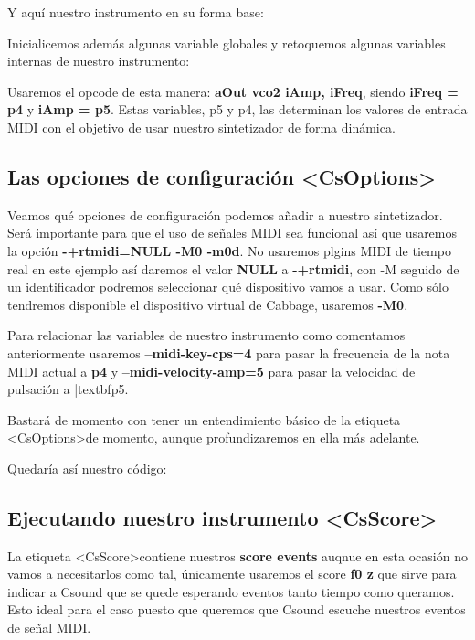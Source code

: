 Y aquí nuestro instrumento en su forma base:

Inicialicemos además algunas variable globales y retoquemos algunas variables internas de nuestro instrumento:


Usaremos el opcode de esta manera: \textbf{aOut vco2 iAmp, iFreq}, siendo \textbf{iFreq = p4} y \textbf{iAmp = p5}. Estas variables, p5 y p4, las determinan los valores de entrada MIDI con el objetivo de usar nuestro sintetizador de forma dinámica.

\subsection{Las opciones de configuración \textless CsOptions\textgreater}\label{sec:optSinte}

Veamos qué opciones de configuración podemos añadir a nuestro sintetizador. Será importante para que el uso de señales MIDI sea funcional así que usaremos la opción \textbf{-+rtmidi=NULL -M0 -m0d}. No usaremos plgins MIDI de tiempo real en este ejemplo así daremos el valor \textbf{NULL} a \textbf{-+rtmidi}, con -M seguido de un identificador podremos seleccionar qué dispositivo vamos a usar. Como sólo tendremos disponible el dispositivo virtual de Cabbage, usaremos \textbf{-M0}. 

Para relacionar las variables de nuestro instrumento como comentamos anteriormente usaremos \textbf{--midi-key-cps=4} para pasar la frecuencia de la nota MIDI actual a \textbf{p4} y \textbf{--midi-velocity-amp=5} para pasar la velocidad de pulsación a |textbf{p5}.

Bastará de momento con tener un entendimiento básico de la etiqueta \textless CsOptions\textgreater de momento, aunque profundizaremos en ella más adelante.

Quedaría así nuestro código:


\subsection{Ejecutando nuestro instrumento \textless CsScore\textgreater}\label{sec:scoreSinte}

La etiqueta \textless CsScore\textgreater contiene nuestros \textbf{score events} auqnue en esta ocasión no vamos a necesitarlos como tal, únicamente usaremos el score \textbf{f0 z} que sirve para indicar a Csound que se quede esperando eventos tanto tiempo como queramos. Esto ideal para el caso puesto que queremos que Csound escuche nuestros eventos de señal MIDI.

